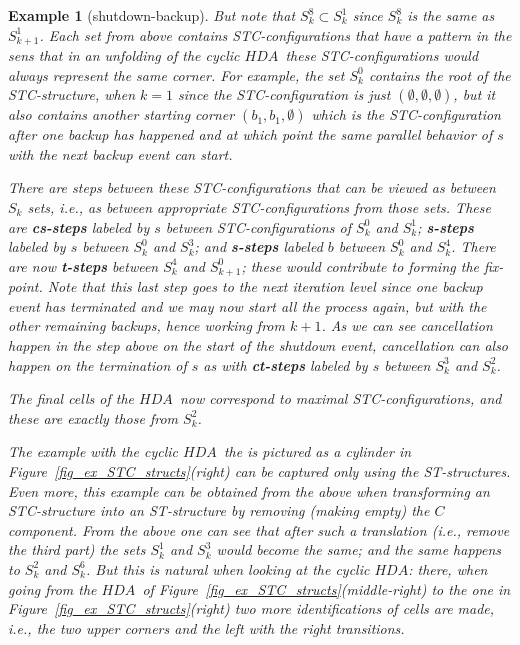 \documentclass[submission,copyright,creativecommons]{eptcs}
\newtheorem{example}[theorem]{Example}
\newcommand\HDA{\ensuremath{\mathit{HDA}}}
\begin{document}
\begin{example}[shutdown-backup]
But note that $S_{k}^{8}\subset S_{k}^{1}$ since $S_{k}^{8}$ is the same as $S_{k+1}^{1}$.
Each set from above contains STC-configurations that have a pattern in the sens that in an unfolding of the cyclic \HDA\ these STC-configurations would always represent the same corner. For example, the set $S_{k}^{0}$ contains the root of the STC-structure, when $k=1$ since the STC-configuration is just $(\emptyset,\emptyset,\emptyset)$, but it also contains another starting corner $(b_{1},b_{1},\emptyset)$ which is the STC-configuration after one backup has happened and at which point the same parallel behavior of $s$ with the next backup event can start.

There are steps between these STC-configurations that can be viewed as between $S_{k}$ sets, i.e., as between appropriate STC-configurations from those sets. These are \textbf{cs-steps} labeled by $s$ between STC-configurations of $S_{k}^{0}$ and $S_{k}^{1}$; \textbf{s-steps} labeled by $s$ between $S_{k}^{0}$ and $S_{k}^{3}$; and \textbf{s-steps} labeled $b$ between $S_{k}^{0}$ and $S_{k}^{4}$.
There are now \textbf{t-steps} between $S_{k}^{4}$ and $S_{k+1}^{0}$; these would contribute to forming the fix-point. Note that this last step goes to the next iteration level since one backup event has terminated and we may now start all the process again, but with the other remaining backups, hence working from $k+1$.
As we can see cancellation happen in the step above on the start of the shutdown event, cancellation can also happen on the termination of $s$ as with \textbf{ct-steps} labeled by $s$ between $S_{k}^{3}$ and $S_{k}^{2}$.

The \textit{final} cells of the \HDA\ now correspond to \textit{maximal} STC-configurations, and these are exactly those from $S_{k}^{2}$.

The example with the cyclic \HDA\ the is pictured as a cylinder in Figure~\ref{fig_ex_STC_structs}(right) can be captured only using the ST-structures. Even more, this example can be obtained from the above when transforming an STC-structure into an ST-structure by removing (making empty) the $C$ component. From the above one can see that after such a translation (i.e., remove the third part) the sets $S_{k}^{1}$ and $S_{k}^{3}$ would become the same; and the same happens to $S_{k}^{2}$ and $S_{k}^{6}$. But this is natural when looking at the cyclic \HDA: there, when going from the \HDA\ of Figure~\ref{fig_ex_STC_structs}(middle-right) to the one in Figure~\ref{fig_ex_STC_structs}(right) two more identifications of cells are made, i.e., the two upper corners and the left with the right transitions.
\end{example}
\end{document}
